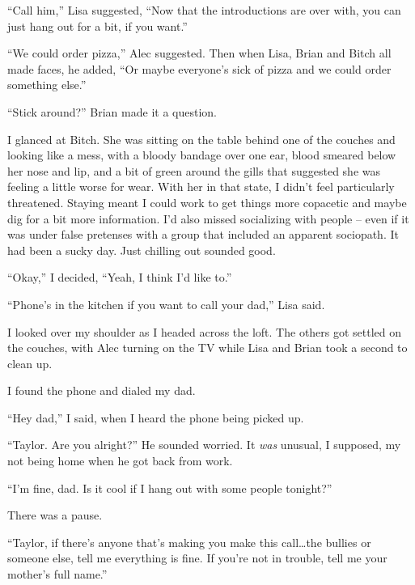 ``Call him,'' Lisa suggested, ``Now that the introductions are over with, you can just hang out for a bit, if you want.''



``We could order pizza,'' Alec suggested.  Then when Lisa, Brian and Bitch all made faces, he added, ``Or maybe everyone's sick of pizza and we could order something else.''



``Stick around?'' Brian made it a question.



I glanced at Bitch.  She was sitting on the table behind one of the couches and looking like a mess, with a bloody bandage over one ear, blood smeared below her nose and lip, and a bit of green around the gills that suggested she was feeling a little worse for wear.  With her in that state, I didn't feel particularly threatened.  Staying meant I could work to get things more copacetic and maybe dig for a bit more information.  I'd also missed socializing with people – even if it was under false pretenses with a group that included an apparent sociopath.  It had been a sucky day.  Just chilling out sounded good.



``Okay,'' I decided, ``Yeah, I think I'd like to.''



``Phone's in the kitchen if you want to call your dad,'' Lisa said.



I looked over my shoulder as I headed across the loft.  The others got settled on the couches, with Alec turning on the TV while Lisa and Brian took a second to clean up.



I found the phone and dialed my dad.



``Hey dad,'' I said, when I heard the phone being picked up.



``Taylor.  Are you alright?''  He sounded worried.  It \emph{was} unusual, I supposed, my not being home when he got back from work.



``I'm fine, dad.  Is it cool if I hang out with some people tonight?''



There was a pause.



``Taylor, if there's anyone that's making you make this call\ldots the bullies or someone else, tell me everything is fine.  If you're not in trouble, tell me your mother's full name.''



